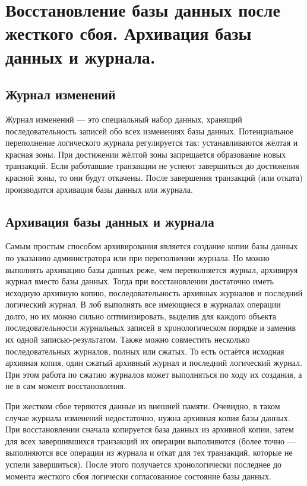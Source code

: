 \documentclass[a4paper,12pt]{article}
\begin{document}
\section{Восстановление базы данных после жесткого сбоя. Архивация базы данных и журнала.}

\subsection{Журнал изменений}

Журнал изменений --- это специальный набор данных, хранящий последовательность записей обо всех изменениях базы данных. Потенциальное переполнение логического журнала регулируется так: устанавливаются жёлтая и красная зоны. При достижении жёлтой зоны запрещается образование новых транзакций. Если работавшие транзакции не успеют завершиться до достижения красной зоны, то они будут откачены. После завершения транзакций (или отката) производится архивация базы данных или журнала.

\subsection{Архивация базы данных и журнала}

Самым простым способом архивирования является создание копии базы данных по указанию администратора или при переполнении журнала. Но можно выполнять архивацию базы данных реже, чем переполняется журнал, архивируя журнал вместо базы данных. Тогда при восстановлении достаточно иметь исходную архивную копию, последовательность архивных журналов и последний логический журнал. В лоб выполнять все имеющиеся в журналах операции долго, но их можно сильно оптимизировать, выделив для каждого объекта последовательности журнальных записей в хронологическом порядке и заменив их одной записью-результатом. Также можно совместить несколько последовательных журналов, полных или сжатых. То есть остаётся исходная архивная копия, один сжатый архивный журнал и последний логический журнал. При этом работа по сжатию журналов может выполняться по ходу их создания, а не в сам момент восстановления.

При жестком сбое теряются данные из внешней памяти. Очевидно, в таком случае журнала изменений недостаточно, нужна архивная копия базы данных. При восстановлении сначала копируется база данных из архивной копии, затем для всех завершившихся транзакций их операции выполняются (более точно --- выполняются все операции из журнала и откат для тех транзакций, которые не успели завершиться). После этого получается хронологически последнее до момента жесткого сбоя логически согласованное состояние базы данных.
\end{document}
